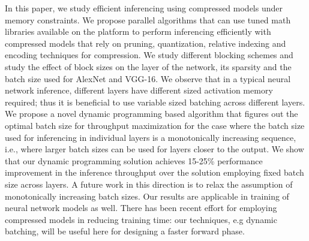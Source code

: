 In this paper, we study efficient inferencing using compressed models under memory constraints. 
We propose parallel algorithms  that can use tuned math libraries available on the platform to perform inferencing efficiently
with compressed models that rely on pruning, quantization, relative indexing and encoding techniques for compression.
We study different blocking  schemes and study the effect of block sizes on  the layer of the network, its sparsity and the batch size used for AlexNet and VGG-16.
We observe that in a typical neural network inference, different layers have different sized activation memory required; thus it is beneficial
to use variable sized batching across different layers. We propose a novel dynamic programming based algorithm that figures 
out the optimal batch size for throughput maximization for the case where the batch size used for inferencing in individual layers
is a monotonically increasing sequence, 
i.e., where larger batch sizes  can be used for layers closer to the output. We show that our dynamic programming solution 
achieves 15-25\%   performance improvement  in the inference throughput over the solution employing fixed batch size  across layers.
A future work in this direction is to relax the assumption of monotonically increasing batch sizes. Our results are applicable in training of neural network models as well.
There has been recent effort for employing compressed  models in reducing training time: our 
techniques, e.g dynamic batching,  will be useful here for designing a faster forward phase.
